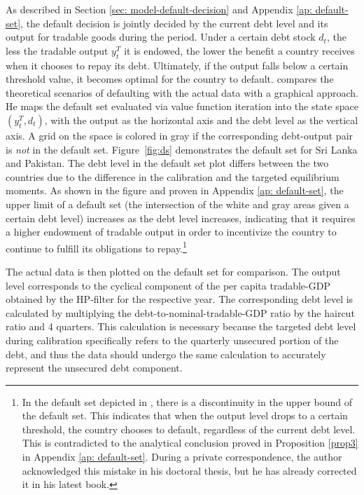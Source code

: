 As described in Section \ref{sec: model-default-decision} and Appendix \ref{ap: default-set}, the default decision is jointly decided by the current debt level and its output for tradable goods during the period. Under a certain debt stock $d_t$, the less the tradable output $y^T_t$ it is endowed, the lower the benefit a country receives when it chooses to repay its debt.
Ultimately, if the output falls below a certain threshold value, it becomes optimal for the country to default.
\citet{Hinrichsen_2020-chapter4} compares the theoretical scenarios of defaulting with the actual data with a graphical approach. He maps the default set evaluated via value function iteration into the state space $(y^T_t, d_t)$, with the output as the horizontal axis and the debt level as the vertical axis. A grid on the space is colored in gray if the corresponding debt-output pair is \emph{not} in the default set. Figure~\ref{fig:ds} demonstrates the default set for Sri Lanka and Pakistan. The debt level in the default set plot differs between the two countries due to the difference in the calibration and the targeted equilibrium moments. As shown in the figure and proven in Appendix \ref{ap: default-set}, the upper limit of a default set (the intersection of the white and gray areas given a certain debt level) increases as the debt level increases, indicating that it requires a higher endowment of tradable output in order to incentivize the country to continue to fulfill its obligations to repay.\footnote{
    In the default set depicted in \citet{Hinrichsen_2020-chapter4}, there is a discontinuity in the upper bound of the default set. This indicates that when the output level drops to a certain threshold, the country chooses to default, regardless of the current debt level. This is contradicted to the analytical conclusion proved in Proposition \ref{prop3} in Appendix \ref{ap: default-set}. During a private correspondence, the author acknowledged this mistake in his doctoral thesis, but he has already corrected it in his latest book.
}

The actual data is then plotted on the default set for comparison. The output level corresponds to the cyclical component of the per capita tradable-GDP obtained by the HP-filter for the respective year.
The corresponding debt level is calculated by multiplying the debt-to-nominal-tradable-GDP ratio by the haircut ratio and 4 quarters. This calculation is necessary because the targeted debt level during calibration specifically refers to the quarterly unsecured portion of the debt, and thus the data should undergo the same calculation to accurately represent the unsecured debt component.

